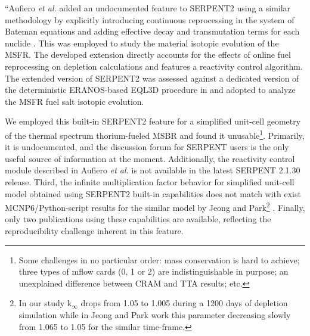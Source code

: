 \documentclass[answers,11pt]{exam}
\begin{document}
\begin{questions}
\begin{solution}
                
                ``Aufiero \emph{et al.} added an undocumented feature to SERPENT2 
                using a similar methodology by explicitly introducing 
                continuous reprocessing in the system of Bateman equations and 
                adding effective decay and transmutation terms for each nuclide 
                \cite{aufiero_extended_2013}. This was employed to study the 
                material isotopic evolution of the 
                \gls{MSFR}\cite{aufiero_extended_2013}. The developed extension 
                directly accounts for the effects of online fuel reprocessing 
                on depletion calculations and features a reactivity control 
                algorithm. The extended version of SERPENT2 was assessed 
                against a dedicated version of the deterministic ERANOS-based 
                EQL3D procedure in \cite{ruggieri_eranos_2006, 
                fiorina_investigation_2013} and adopted to analyze the 
                \gls{MSFR} fuel salt isotopic evolution.
                
                We employed this built-in SERPENT2 feature for a simplified 
                unit-cell geometry of the thermal spectrum thorium-fueled 
                \gls{MSBR} and found it unusable\footnote{ Some challenges in 
                no particular order: mass conservation is hard to achieve; 
                three types of mflow cards (0, 1 or 2) are indistinguishable in 
                purpose; an unexplained difference between CRAM and TTA 
                results; etc.}. Primarily, it is undocumented, and the 
                discussion forum for SERPENT users is the only useful source of 
                information at the moment. Additionally, the reactivity control 
                module described in Aufiero \emph{et al.} is not available in 
                the latest SERPENT 2.1.30 release. Third, the infinite 
                multiplication factor behavior for simplified unit-cell model 
                obtained using SERPENT2 built-in capabilities 
                \cite{rykhlevskii_online_2017} does not match with exist 
                MCNP6/Python-script results for the similar model by Jeong and 
                Park\footnote{ In our study k$_{\infty}$ drops from 1.05 to 
                1.005 during a 1200 days of depletion simulation while in Jeong 
                and Park work this parameter decreasing slowly from 1.065 to 
                1.05 for the similar time-frame.} 
                \cite{jeong_equilibrium_2016}. Finally, only two publications 
                \cite{aufiero_extended_2013, ashraf_nuclear_2018} using these 
                capabilities are available, reflecting the reproducibility 
                challenge inherent in this feature.
                

\end{solution}
\end{questions}
\end{document}
